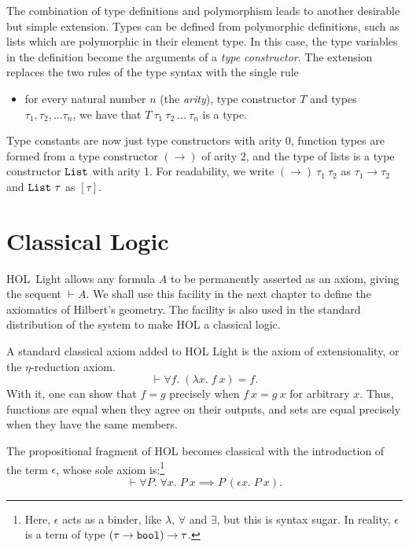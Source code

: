 The combination of type definitions and polymorphism leads to another desirable but simple extension. Types can be defined from polymorphic definitions, such as lists which are polymorphic in their element type. In this case, the type variables in the definition become the arguments of a \emph{type constructor}. The extension replaces the two rules of the type syntax with the single rule

\begin{itemize}
\item[] for every natural number $n$ (the \emph{arity}), type constructor $T$ and types $\tau_1, \tau_2, \ldots \tau_n$, we have that $T\ \tau_1\ \tau_2\ \ldots\ \tau_n$ is a type.
\end{itemize}

Type constants are now just type constructors with arity 0, function types are formed from a type constructor $(\rightarrow)$ of arity 2, and the type of lists is a type constructor $\texttt{List}$ with arity 1. For readability, we write $(\rightarrow)\ \tau_1\ \tau_2$ as $\tau_1 \rightarrow \tau_2$ and $\texttt{List}\ \tau$ as $[\tau]$.

\section{Classical Logic}\label{sec:ClassicalAxioms}
HOL~Light allows any formula $A$ to be permanently asserted as an axiom, giving the sequent $\vdash A$. We shall use this facility in the next chapter to define the axiomatics of Hilbert's geometry. The facility is also used in the standard distribution of the system to make HOL a classical logic.

A standard classical axiom added to HOL Light is the axiom of extensionality, or the $\eta$-reduction axiom. 
\begin{displaymath}
\vdash \forall f.\; (\lambda x.\; f\ x) = f.
\end{displaymath}
With it, one can show that $f = g$ precisely when $f\ x = g\ x$ for arbitrary $x$. Thus, functions are equal when they agree on their outputs, and sets are equal precisely when they have the same members.

The propositional fragment of HOL becomes classical with the introduction of the term $\epsilon$, whose sole axiom is:\footnote{Here, $\epsilon$ acts as a binder, like $\lambda$, $\forall$ and $\exists$, but this is syntax sugar. In reality, $\epsilon$ is a term of type $(\tau \rightarrow \texttt{bool}) \rightarrow \tau$.}
\begin{displaymath}
\vdash \forall P.\;\forall x.\; P\ x \implies P\ (\epsilon x.\; P\ x).
\end{displaymath}

